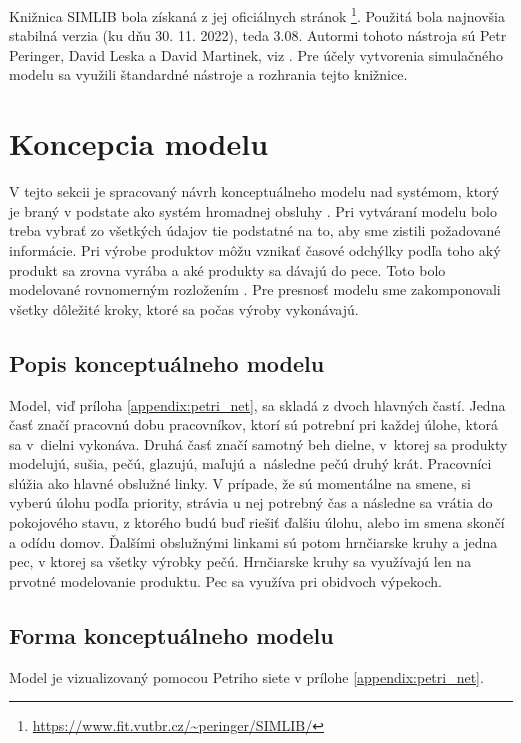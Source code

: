\documentclass[11pt,a4paper]{article}
\begin{document}
Knižnica SIMLIB bola získaná z jej oficiálnych stránok \footnote{\url{https://www.fit.vutbr.cz/~peringer/SIMLIB/}}. Použitá bola najnovšia stabilná verzia (ku dňu 30. 11. 2022), teda 3.08. Autormi tohoto nástroja sú Petr Peringer, David Leska a David Martinek, viz \cite{SIMLIB}. Pre účely vytvorenia simulačného modelu \cite[44. strana]{IMS_slides} sa využili štandardné nástroje a rozhrania tejto knižnice.

\section{Koncepcia modelu}
V tejto sekcii je spracovaný návrh konceptuálneho modelu \cite[43. strana]{IMS_slides} nad systémom, ktorý je braný v podstate ako systém hromadnej obsluhy \cite[136. strana]{IMS_slides}. Pri vytváraní modelu bolo treba vybrať zo všetkých údajov tie podstatné na to, aby sme zistili požadované informácie. Pri výrobe produktov môžu vznikať časové odchýlky podľa toho aký produkt sa zrovna vyrába a aké produkty sa dávajú do pece. Toto bolo modelované rovnomerným rozložením \cite[89. strana]{IMS_slides}. Pre presnosť modelu sme zakomponovali všetky dôležité kroky, ktoré sa počas výroby vykonávajú.

\subsection{Popis konceptuálneho modelu}
Model, viď príloha \ref{appendix:petri_net}, sa skladá z dvoch hlavných častí. Jedna časť značí pracovnú dobu pracovníkov, ktorí sú potrební pri každej úlohe, ktorá sa v~dielni vykonáva. Druhá časť značí samotný beh dielne, v~ktorej sa produkty modelujú, sušia, pečú, glazujú, maľujú a~následne pečú druhý krát. Pracovníci slúžia ako hlavné obslužné linky. V prípade, že sú momentálne na smene, si vyberú úlohu podľa priority, strávia u nej potrebný čas a následne sa vrátia do pokojového stavu, z ktorého budú buď riešiť ďalšiu úlohu, alebo im smena skončí a odídu domov. Ďalšími obslužnými linkami sú potom hrnčiarske kruhy a jedna pec, v ktorej sa všetky výrobky pečú. Hrnčiarske kruhy sa využívajú len na prvotné modelovanie produktu. Pec sa využíva pri obidvoch výpekoch.

\subsection{Forma konceptuálneho modelu}
Model je vizualizovaný pomocou Petriho siete v prílohe \ref{appendix:petri_net}.
\end{document}
